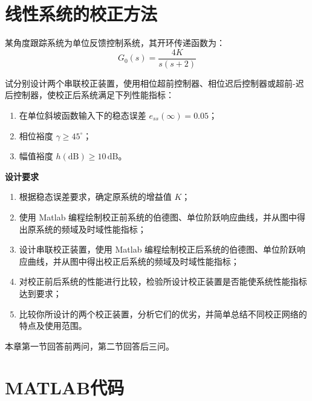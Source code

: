 \documentclass[a4paper]{ctexbook}
\makeatletter
\def\addcontentsline#1#2#3{%
  \protected@write\@auxout{}%
    {\string\@writefile{#1}{\string\contentsline{#2}{#3}{\thepage}}}%
}
\makeatother
\begin{document}
\newpage

\newpage

\newpage

\newpage
\chapter{线性系统的校正方法}



某角度跟踪系统为单位反馈控制系统，其开环传递函数为：
\[
G_0(s) = \frac{4K}{s(s+2)}
\]

试分别设计两个串联校正装置，使用相位超前控制器、相位迟后控制器或超前-迟后控制器，使校正后系统满足下列性能指标：

\begin{enumerate}
    \item[(1)] 在单位斜坡函数输入下的稳态误差 $e_{ss}(\infty) = 0.05$；
    \item[(2)] 相位裕度 $\gamma \geq 45^\circ$；
    \item[(3)] 幅值裕度 $h(\mathrm{dB}) \geq 10\,\mathrm{dB}$。
\end{enumerate}

\vspace{1em}

\noindent\textbf{设计要求}

\begin{enumerate}
    \item[(1)] 根据稳态误差要求，确定原系统的增益值 $K$；
    \item[(2)] 使用 Matlab 编程绘制校正前系统的伯德图、单位阶跃响应曲线，并从图中得出原系统的频域及时域性能指标；
    \item[(3)] 设计串联校正装置，使用 Matlab 编程绘制校正后系统的伯德图、单位阶跃响应曲线，并从图中得出校正后系统的频域及时域性能指标；
    \item[(4)] 对校正前后系统的性能进行比较，检验所设计校正装置是否能使系统性能指标达到要求；
    \item[(5)] 比较你所设计的两个校正装置，分析它们的优劣，并简单总结不同校正网络的特点及使用范围。
\end{enumerate}
 
本章第一节回答前两问，第二节回答后三问。

\newpage

\newpage

\newpage

\appendix
\chapter{MATLAB代码}
\newpage
\end{document}
